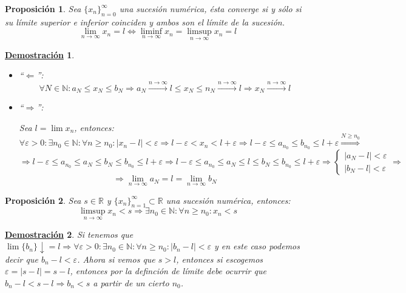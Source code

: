 \documentclass[10pt,a4paper,openright]{book}
\theoremstyle{break}
\newtheorem{prop}{Proposición}[chapter]
\newtheorem*{demo}{\underline{Demostración}}
\begin{document}
\begin{prop}
Sea $\{x_n\}_{n=0}^\infty$ una sucesión numérica, ésta converge si y sólo si su límite superior e inferior coinciden y ambos son el límite de la sucesión.
\[
\lim_{n\rightarrow \infty}x_n=l\Leftrightarrow \liminf_{n\rightarrow\infty}x_n= \limsup_{n\rightarrow\infty}x_n=l
\]
\end{prop}
\begin{demo}
\begin{itemize}
\item ``$\Leftarrow$'':
$$\forall N\in \mathbb N: a_N\leq x_N \leq b_N\Rightarrow a_N\xrightarrow{n\rightarrow\infty} l\leq x_N\leq n_N\xrightarrow{n\rightarrow\infty} l\Rightarrow x_N\xrightarrow{n\rightarrow\infty} l$$

\item ``$\Rightarrow$'':\par
Sea $l=\lim x_n$, entonces:
$$\forall \varepsilon>0: \exists n_0\in \mathbb N : \forall n\geq n_0: |x_n-l|<\varepsilon\Rightarrow l-\varepsilon <x_n<l+\varepsilon\Rightarrow l-\varepsilon \leq a_{n_0} \leq b_{n_0}\leq l+\varepsilon\stackrel{N\geq n_0}{\Rightarrow}$$
$$\Rightarrow l-\varepsilon \leq a_{n_0} \leq a_N \leq b_N \leq b_{n_0} \leq l+\varepsilon\Rightarrow l-\varepsilon \leq a_{n_0} \leq a_N \leq l\leq b_N \leq b_{n_0} \leq l+\varepsilon\Rightarrow \begin{cases}|a_N-l|<\varepsilon \\ |b_N-l|<\varepsilon \end{cases}\Rightarrow$$
$$\Rightarrow \lim_{n\rightarrow\infty}a_N=l= \lim_{n\rightarrow\infty}b_N$$
\end{itemize}
\end{demo}

\begin{prop}
Sea $s\in \mathbb{R}$ y $\{x_n\}_{n=1}^\infty\subset \mathbb{R}$ una sucesión numérica, entonces:
\[
\limsup_{n\rightarrow\infty} x_n < s \Rightarrow \exists n_0 \in \mathbb{N} : \forall n \geq n_0: x_n<s
\]
\end{prop}
\begin{demo}
Si tenemos que $\lim \{b_n\}\downarrow = l\Rightarrow \forall \varepsilon>0 : \exists n_0\in \mathbb N: \forall n\geq n_0: |b_n-l|<\varepsilon $ y en este caso podemos decir que $b_n-l<\varepsilon$. Ahora si vemos que $s>l$, entonces si escogemos $\varepsilon = |s-l|=s-l$, entonces por la definción de límite debe ocurrir que $b_n-l<s-l\Rightarrow b_n<s$ a partir de un cierto $n_0$.
\end{demo}
\end{document}
